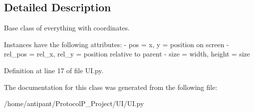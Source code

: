 \subsection{Detailed Description}
\begin{DoxyVerb}Base class of everything with coordinates.

Instances have the following attributes:
- pos     = x, y          = position on screen
- rel_pos = rel_x, rel_y  = position relative to parent
- size    = width, height = size
\end{DoxyVerb}
 

Definition at line 17 of file U\-I.\-py.



The documentation for this class was generated from the following file\-:\begin{DoxyCompactItemize}
\item 
/home/antipant/\-Protocol\-P\-\_\-\-Project/\-U\-I/U\-I.\-py\end{DoxyCompactItemize}
